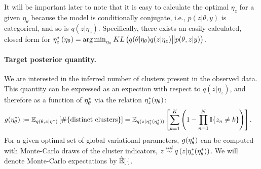 It will be important later to note that it is easy to calculate the optimal
$\eta_z$ for a given $\eta_\theta$ because the model is conditionally conjugate,
i.e., $p\left(z \vert \theta, y\right)$ is categorical, and so is $q\left(z
\vert \eta_z\right)$.  Specifically, there exists an easily-calculated, closed
form for
%
$
\eta_z^{*}\left(\eta_\theta\right) = \operatorname*{arg\,min}_{\eta_z}
    KL\left(
    q(\theta \vert \eta_\theta) q( z \vert \eta_z)
        \big\| p(\theta, z | y)
    \right).
$
%



\paragraph{Target posterior quantity.}

We are interested in the inferred number of clusters present in the observed
data.  This quantity can be expressed as an expection with respect to
$q\left(z \vert \eta_z \right)$, and therefore as a function of
$\eta_\theta^{*}$ via the relation $\eta_z^{*}(\eta_\theta)$:
%
\begin{align}
g(\eta_\theta^{*}) &:=
\mathbb{E}_{q(\theta, z \vert \eta^{*})} \left[ \#\{\text{distinct clusters}\} \right]  =
\mathbb{E}_{q(z \vert \eta_z^{*}(\eta_\theta^{*}))} \left[
    \sum_{k=1}^K \left(1 - \prod_{n=1}^N \mathbb{I}\{z_n \ne k\} \right) \right].
    \label{eq:expected_num_clusters}
\end{align}
%
For a given optimal set of global variational parameters, $g(\eta_\theta^{*})$ can
be computed with Monte-Carlo draws of the cluster indicators, $z \stackrel{iid}{\sim} q\left(z
\vert \eta_z^{*}(\eta_\theta^{*})\right)$.  We will denote Monte-Carlo expectations
by $\hat{\mathbb{E}}[\cdot]$.
